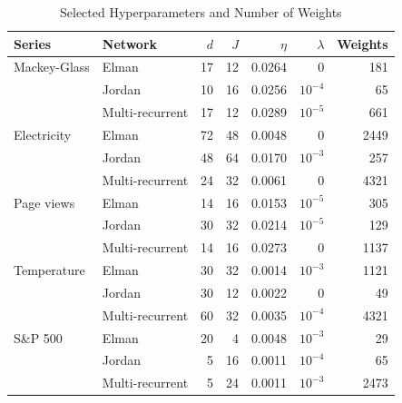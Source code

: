 \begin{table}[t]
\centering
\caption{Selected Hyperparameters and Number of Weights}
\label{tab:tuning}
\footnotesize
\setlength{\tabcolsep}{4pt}
\begin{tabular}{@{}llrrrrr@{}}
\toprule
Series & Network & $d$ & $J$ & $\eta$ & $\lambda$ & Weights \\
\midrule
Mackey-Glass & Elman & 17 & 12 & 0.0264 & 0 & 181 \\
 & Jordan & 10 & 16 & 0.0256 & $10^{-4}$ & 65 \\
 & Multi-recurrent & 17 & 12 & 0.0289 & $10^{-5}$ & 661 \\
\midrule
Electricity & Elman & 72 & 48 & 0.0048 & 0 & 2449 \\
 & Jordan & 48 & 64 & 0.0170 & $10^{-3}$ & 257 \\
 & Multi-recurrent & 24 & 32 & 0.0061 & 0 & 4321 \\
\midrule
Page views & Elman & 14 & 16 & 0.0153 & $10^{-5}$ & 305 \\
 & Jordan & 30 & 32 & 0.0214 & $10^{-5}$ & 129 \\
 & Multi-recurrent & 14 & 16 & 0.0273 & 0 & 1137 \\
\midrule
Temperature & Elman & 30 & 32 & 0.0014 & $10^{-3}$ & 1121 \\
 & Jordan & 30 & 12 & 0.0022 & 0 & 49 \\
 & Multi-recurrent & 60 & 32 & 0.0035 & $10^{-4}$ & 4321 \\
\midrule
S\&P 500 & Elman & 20 & 4 & 0.0048 & $10^{-3}$ & 29 \\
 & Jordan & 5 & 16 & 0.0011 & $10^{-4}$ & 65 \\
 & Multi-recurrent & 5 & 24 & 0.0011 & $10^{-3}$ & 2473 \\
\bottomrule
\end{tabular}
\end{table}
